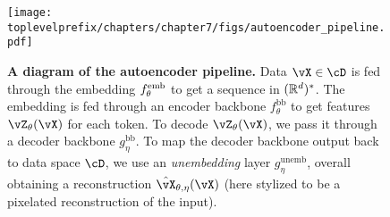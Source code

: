 \documentclass[\toplevelprefix/book-main.tex]{subfiles}
\begin{document}
\begin{figure}
    \texttt{[image: \\toplevelprefix/chapters/chapter7/figs/autoencoder\_pipeline.pdf]}
    \caption{\small\textbf{A diagram of the autoencoder pipeline.} Data \(\vX \in \cD\) is fed through the embedding \(f_{\theta}^{\mathrm{emb}}\) to get a sequence in \((\mathbb{R}^{d})^{*}\). The embedding is fed through an encoder backbone \(f_{\theta}^{\mathrm{bb}}\) to get features \(\vZ_{\theta}(\vX)\) for each token. To decode \(\vZ_{\theta}(\vX)\), we pass it through a decoder backbone \(g_{\eta}^{\mathrm{bb}}\). To map the decoder backbone output back to data space \(\cD\), we use an \textit{unembedding} layer \(g_{\eta}^{\mathrm{unemb}}\), overall obtaining a reconstruction \(\hat{\vX}_{\theta, \eta}(\vX)\) (here stylized to be a pixelated reconstruction of the input).}
    \label{fig:overall_autoencoder_pipeline}
\end{figure}
\end{document}
